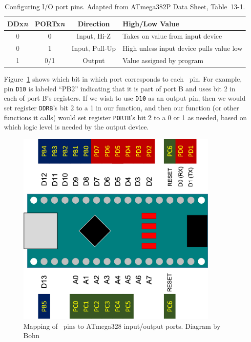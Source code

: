 \begin{table}
    \centering
    \begin{tabular}{|c|c|c|l|}
        \hline
        \textbf{DDx\textit{n}} & \textbf{PORTx\textit{n}} & \textbf{Direction} & \textbf{High/Low Value} \\ \hline \hline
        0 & 0   & Input, Hi-Z       & Takes on value from input device \\
        0 & 1   & Input, Pull-Up    & High unless input device pulls value low \\
        1 & 0/1 & Output            & Value assigned by program \\ \hline
    \end{tabular}
    \caption{Configuring I/O port pins. \tiny Adapted from ATmega382P Data Sheet, Table~13-1. \label{table:DataDirection}}
\end{table}

Figure~\ref{fig:NanoPinMapping} shows which bit in which port corresponds to
each \nano\ pin. For example, pin \texttt{D10} is labeled ``PB2'' indicating
that it is part of port B and uses bit 2 in each of port B's registers. If we
wish to use \texttt{D10} as an output pin, then we would set register
\texttt{DDRB}'s bit 2 to a 1 in our  function, and then our
 function (or other functions it calls) would set register
\texttt{PORTB}'s bit 2 to a 0 or 1 as needed, based on which logic level is
needed by the output device.

\begin{figure}
    \centering
    \includegraphics[width=10cm]{NanoPinMapping}
    \caption{Mapping of \nano\ pins to ATmega328 input/output ports. \tiny Diagram by Bohn \label{fig:NanoPinMapping}}
\end{figure}

